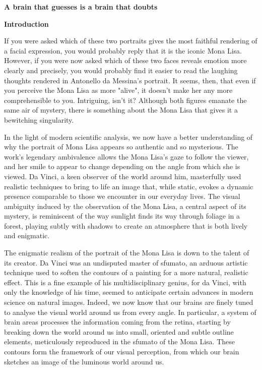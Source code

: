 \textbf{A brain that guesses is a brain that doubts}

\textbf{Introduction}

If you were asked which of these two portraits gives the most faithful rendering of a facial expression, you would probably reply that it is the iconic Mona Lisa. However, if you were now asked which of these two faces reveals emotion more clearly and precisely, you would probably find it easier to read the laughing thoughts rendered in Antonello da Messina's portrait. It seems, then, that even if you perceive the Mona Lisa as more "alive", it doesn't make her any more comprehensible to you. Intriguing, isn't it? Although both figures emanate the same air of mystery, there is something about the Mona Lisa that gives it a bewitching singularity.

In the light of modern scientific analysis, we now have a better understanding of why the portrait of Mona Lisa appears so authentic and so mysterious. The work's legendary ambivalence allows the Mona Lisa's gaze to follow the viewer, and her smile to appear to change depending on the angle from which she is viewed. Da Vinci, a keen observer of the world around him, masterfully used realistic techniques to bring to life an image that, while static, evokes a dynamic presence comparable to those we encounter in our everyday lives. The visual ambiguity induced by the observation of the Mona Lisa, a central aspect of its mystery, is reminiscent of the way sunlight finds its way through foliage in a forest, playing subtly with shadows to create an atmosphere that is both lively and enigmatic.

The enigmatic realism of the portrait of the Mona Lisa is down to the talent of its creator. Da Vinci was an undisputed master of sfumato, an arduous artistic technique used to soften the contours of a painting for a more natural, realistic effect. This is a fine example of his multidisciplinary genius, for da Vinci, with only the knowledge of his time, seemed to anticipate certain advances in modern science on natural images. Indeed, we now know that our brains are finely tuned to analyse the visual world around us from every angle. In particular, a system of brain areas processes the information coming from the retina, starting by breaking down the world around us into small, oriented and subtle outline elements, meticulously reproduced in the sfumato of the Mona Lisa. These contours form the framework of our visual perception, from which our brain sketches an image of the luminous world around us.

